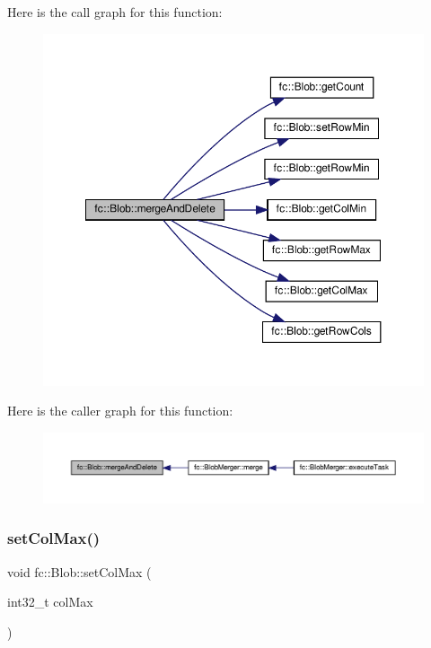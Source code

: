 Here is the call graph for this function\+:
\nopagebreak
\begin{figure}[H]
\begin{center}
\leavevmode
\includegraphics[width=350pt]{d2/d7e/classfc_1_1Blob_ae84692d9e132dd046b56bb6ac06dd8bb_cgraph}
\end{center}
\end{figure}
Here is the caller graph for this function\+:
\nopagebreak
\begin{figure}[H]
\begin{center}
\leavevmode
\includegraphics[width=350pt]{d2/d7e/classfc_1_1Blob_ae84692d9e132dd046b56bb6ac06dd8bb_icgraph}
\end{center}
\end{figure}
\mbox{\label{classfc_1_1Blob_a0534b6d033d5dc27f24f7f7776b148c0}} 
\subsubsection{\texorpdfstring{set\+Col\+Max()}{setColMax()}}
{\footnotesize\ttfamily void fc\+::\+Blob\+::set\+Col\+Max (\begin{DoxyParamCaption}\item[{int32\+\_\+t}]{col\+Max }\end{DoxyParamCaption})\hspace{0.3cm}{\ttfamily [inline]}}



